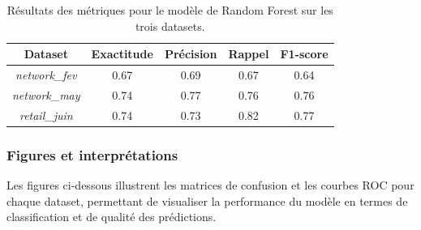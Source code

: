 \begin{table}[H]
    \centering
    \begin{tabular}{|c|c|c|c|c|}
        \hline
        \textbf{Dataset} & \textbf{Exactitude} & \textbf{Précision} & \textbf{Rappel} & \textbf{F1-score} \\
        \hline
        \textit{network\_fev} & 0.67 & 0.69 & 0.67 & 0.64 \\
        \textit{network\_may} & 0.74 & 0.77 & 0.76 & 0.76 \\
        \textit{retail\_juin} & 0.74 & 0.73 & 0.82 & 0.77 \\
        \hline
    \end{tabular}
    \caption{Résultats des métriques pour le modèle de Random Forest sur les trois datasets.}
\end{table}

\subsubsection*{Figures et interprétations}

Les figures ci-dessous illustrent les matrices de confusion et les courbes ROC pour chaque dataset, permettant de visualiser la performance du modèle en termes de classification et de qualité des prédictions.


